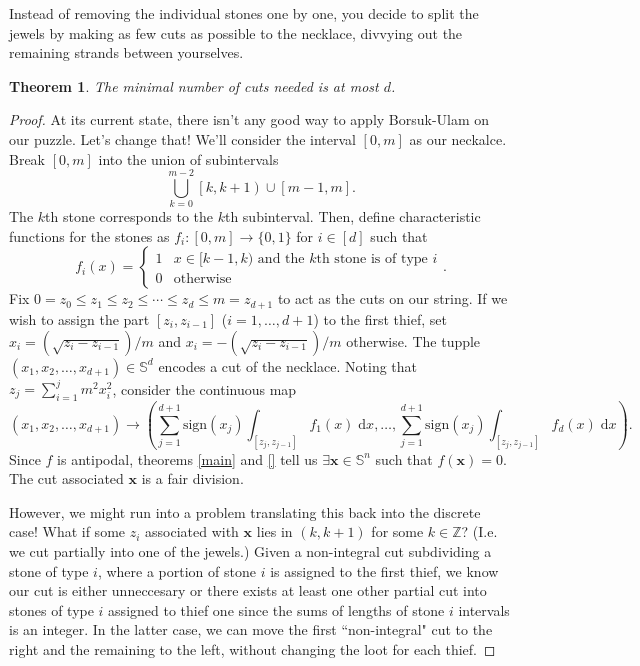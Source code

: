 \documentclass[12pt]{amsart}
\newtheorem{thm}{Theorem}[section]
\theoremstyle{definition}
\begin{document}
    Instead of removing the individual stones one by one, you decide
    to split the jewels by making as few cuts as possible to the
    necklace, divvying out the remaining strands between yourselves.

    \begin{thm}
      The minimal number of cuts needed is at most $d$.
    \end{thm}

    \begin{proof}
      At its current state, there isn't any good way to apply
      Borsuk-Ulam on our puzzle. Let's change that! We'll consider the
      interval $[0,m]$ as our neckalce. Break $[0,m]$ into the union
      of subintervals
      $$\bigcup_{k=0}^{m-2} \left[k, k+1\right) \cup \left[m-1,
        m\right].$$ The $k$th stone corresponds to the $k$th
      subinterval. Then, define characteristic functions for the
      stones as $f_i:[0,m] \to \{0,1\}$ for $i \in [d]$ such
      that
      $$f_i(x) = \begin{cases} 1 & x \in [k-1, k) \text{ and the $k$th
          stone is of type $i$}\\ 0 & \text{otherwise} \end{cases}.$$
      Fix
      $0 = z_0 \leq z_1 \leq z_2 \leq \cdots \leq z_d \leq m= z_{d+1}$
      to act as the cuts on our string. If we wish to assign the part
      $[z_i,z_{i-1}]$ ($i = 1, \ldots, d+1$) to the first thief, set
      $x_i = \left(\sqrt{z_{i} - z_{i-1}}\right)/m$ and
      $x_i = -\left(\sqrt{z_i - z_{i-1}}\right)/m$ otherwise. The
      tupple $(x_1,x_2,\ldots,x_{d+1}) \in \mathbb S^d$ encodes a cut
      of the necklace. Noting that $z_j = \sum_{i=1}^{j} m^2x_i^2$,
      consider the continuous map
      $$(x_1,x_2,\ldots,x_{d+1}) \to \left(\sum_{j=1}^{d+1}
        \mathrm{sign}(x_j) \int_{[z_j,z_{j-1}]} f_1(x) \; \mathrm{d}x
        , \ldots, \sum_{j=1}^{d+1} \mathrm{sign}(x_j)
        \int_{[z_j,z_{j-1}]} f_d(x) \; \mathrm{d}x\right).$$ Since $f$
      is antipodal, theorems \ref{main} and \ref{} tell us
      $\exists \mathbf x \in \mathbb S^n$ such that
      $f(\mathbf x) = 0$. The cut associated $\mathbf x$ is a fair
      division.

      However, we might run into a problem translating this back into
      the discrete case! What if some $z_i$ associated with
      $\mathbf x$ lies in $\left(k, k+1\right)$ for some
      $k \in \mathbb Z$? (I.e. we cut partially into one of the
      jewels.) Given a non-integral cut subdividing a stone of type
      $i$, where a portion of stone $i$ is assigned to the first
      thief, we know our cut is either unneccesary or there exists at
      least one other partial cut into stones of type $i$ assigned to
      thief one since the sums of lengths of stone $i$ intervals is an
      integer. In the latter case, we can move the first
      ``non-integral" cut to the right and the remaining to the left,
      without changing the loot for each thief.
    \end{proof}
    
  
\end{document}
